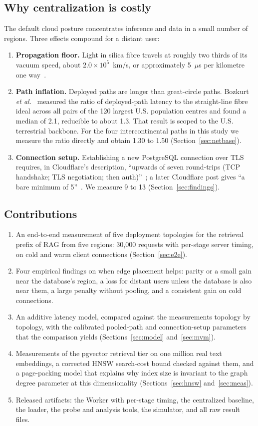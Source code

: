 \documentclass[conference]{IEEEtran}
\begin{document}
\subsection{Why centralization is costly}
The default cloud posture concentrates inference and data in a small number of regions. Three
effects compound for a distant user:
\begin{enumerate}
\item \textbf{Propagation floor.} Light in silica fibre travels at roughly two thirds of its
vacuum speed, about $2.0\times10^{5}$~km/s, or approximately 5~$\mu$s per kilometre one
way~\cite{bozkurt2018}.
\item \textbf{Path inflation.} Deployed paths are longer than great-circle paths. Bozkurt
\emph{et al.}~\cite{bozkurt2018} measured the ratio of deployed-path latency to the straight-line
fibre ideal across all pairs of the 120 largest U.S. population centres and found a median of 2.1,
reducible to about 1.3. That result is scoped to the U.S. terrestrial backbone. For the four
intercontinental paths in this study we measure the ratio directly and obtain 1.30 to 1.50
(Section~\ref{sec:netbase}).
\item \textbf{Connection setup.} Establishing a new PostgreSQL connection over TLS requires, in
Cloudflare's description, ``upwards of seven round-trips (TCP handshake; TLS negotiation; then
auth)''~\cite{hyperdrive2023}; a later Cloudflare post gives ``a bare minimum of
5''~\cite{hyperdrive2025}. We measure 9 to 13 (Section~\ref{sec:findings}).
\end{enumerate}

\subsection{Contributions}
\begin{enumerate}
\item An end-to-end measurement of five deployment topologies for the retrieval prefix of RAG from
five regions: 30{,}000 requests with per-stage server timing, on cold and warm client connections
(Section~\ref{sec:e2e}).
\item Four empirical findings on when edge placement helps: parity or a small gain near
the database's region, a loss for distant users unless the database is also near
them, a large penalty without pooling, and a consistent gain on cold connections.
\item An additive latency model, compared against the measurements topology by topology, with the
calibrated pooled-path and connection-setup parameters that the comparison yields
(Sections~\ref{sec:model} and~\ref{sec:mvm}).
\item Measurements of the pgvector retrieval tier on one million real text embeddings, a corrected HNSW
search-cost bound checked against them, and a page-packing model that explains why index size is
invariant to the graph degree parameter at this dimensionality (Sections~\ref{sec:hnsw}
and~\ref{sec:meas}).
\item Released artifacts: the Worker with per-stage timing, the centralized baseline, the loader,
the probe and analysis tools, the simulator, and all raw result files.
\end{enumerate}
\end{document}
